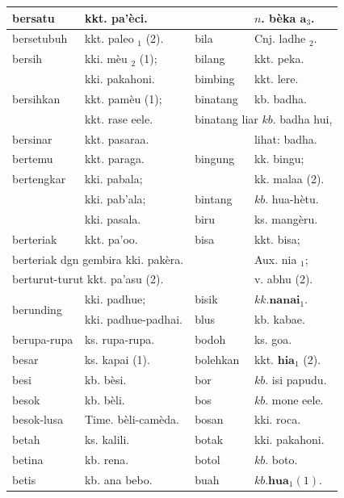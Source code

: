 \documentclass[10pt]{article}
\begin{document}
\begin{center}
\begin{tabular}{|l|l|l|l|}
\hline
bersatu & kkt. pa'èci. &  & \(n\). bèka \(\boldsymbol{a}_{3}\). \\
\hline
bersetubuh & kkt. paleo \({ }_{1}\) (2). & bila & Cnj. ladhe \({ }_{2}\). \\
\hline
bersih & kki. mèu \({ }_{2}\) (1); & bilang & kkt. peka. \\
\hline
 & kki. pakahoni. & bimbing & kkt. lere. \\
\hline
bersihkan & kkt. pamèu (1); & binatang & kb. badha. \\
\hline
 & kkt. rase eele. & \multicolumn{2}{|c|}{binatang liar \(k b\). badha hui,} \\
\hline
bersinar & kkt. pasaraa. &  & lihat: badha. \\
\hline
bertemu & kkt. paraga. & bingung & kk. bingu; \\
\hline
bertengkar & kki. pabala; &  & kk. malaa (2). \\
\hline
 & kki. pab'ala; & bintang & \(k b\). hua-hètu. \\
\hline
 & kki. pasala. & biru & ks. mangèru. \\
\hline
berteriak & kkt. pa'oo. & bisa & kkt. bisa; \\
\hline
\multicolumn{2}{|c|}{berteriak dgn gembira kki. pakèra.} &  & Aux. nia \({ }_{1}\); \\
\hline
\multicolumn{2}{|l|}{berturut-turut kkt. pa'asu (2).} &  & v. abhu (2). \\
\hline
\multirow[t]{2}{*}{berunding} & kki. padhue; & bisik & \(k k . \mathbf{n a n a i}_{1}\). \\
\hline
 & kki. padhue-padhai. & blus & kb. kabae. \\
\hline
berupa-rupa & ks. rupa-rupa. & bodoh & ks. goa. \\
\hline
besar & ks. kapai (1). & bolehkan & kkt. \(\mathbf{h i a}_{1}\) (2). \\
\hline
besi & kb. bèsi. & bor & \(k b\). isi papudu. \\
\hline
besok & kb. bèli. & bos & \(k b\). mone eele. \\
\hline
besok-lusa & Time. bèli-camèda. & bosan & kki. roca. \\
\hline
betah & ks. kalili. & botak & kki. pakahoni. \\
\hline
betina & kb. rena. & botol & \(k b\). boto. \\
\hline
betis & kb. ana bebo. & buah & \(k b . \mathbf{h u a}_{1}(1)\). \\

\end{tabular}
\end{center}
\end{document}
